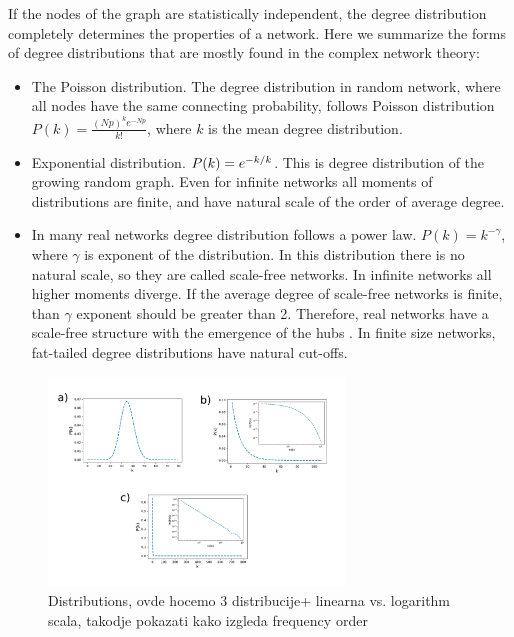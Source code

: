 If the nodes of the graph are statistically independent, the degree distribution completely determines the properties of a network. Here we summarize the forms of degree distributions that are mostly found in the complex network theory:
\begin{itemize}
	\item The Poisson distribution. The degree distribution in random network, where all nodes have the same connecting probability, follows Poisson distribution $P(k)= \frac{(Np)^ke^{-Np}}{k!}$, where $k$ is the mean degree distribution. 
	
	\item Exponential distribution. $P(k) = e^{-k/ \- k}$. This is degree distribution of the growing random graph. Even for infinite networks all moments of distributions are finite, and have natural scale of the order of average degree.
	
	\item In many real networks degree distribution follows a power law. $P(k) = k ^ {-\gamma} $, where $\gamma$ is exponent of the distribution. In this distribution there is no natural scale, so they are called scale-free networks. In infinite networks all higher moments diverge. If the average degree of scale-free networks is finite, than $\gamma$ exponent should be greater than 2. Therefore, real networks have a scale-free structure with the emergence of the hubs \cite{newman2010}. In finite size networks, fat-tailed degree distributions have natural cut-offs. 
\end{itemize}

 \begin{figure}
 	\centering
 	\includegraphics[width=0.7\textwidth]{codes/test1.pdf}
 	\caption{Distributions, ovde hocemo 3 distribucije+ linearna vs. logarithm scala, takodje pokazati kako izgleda frequency order}
 	\label{fig:dist}
 \end{figure}

